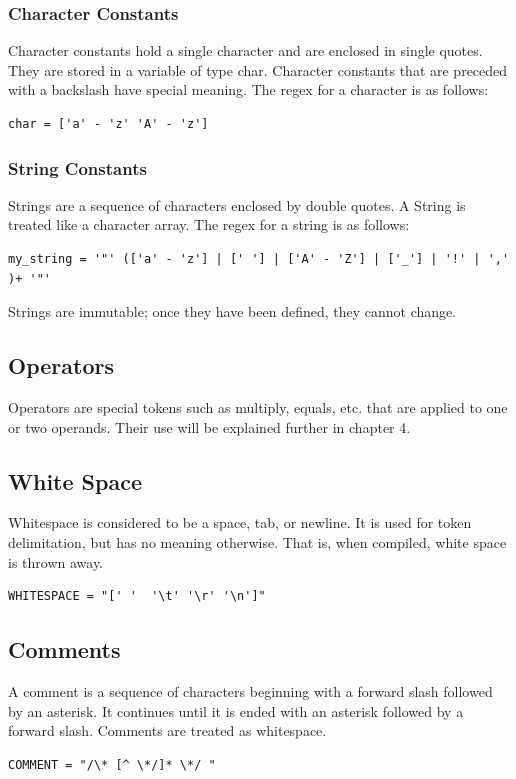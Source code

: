 \documentclass{article}
\begin{document}
\subsubsection{Character Constants}
Character constants hold a single character and are enclosed in single quotes. They are stored in a variable of type char. Character constants that are preceded with a backslash have special meaning. The regex for a character is as follows:

\begin{Verbatim}[frame=single]
char = ['a' - 'z' 'A' - 'z']
\end{Verbatim}

\subsubsection{String Constants}
Strings are a sequence of characters enclosed by double quotes. A String is treated like a character array. The regex for a string is as follows:

\begin{Verbatim}[frame=single]
my_string = '"' (['a' - 'z'] | [' '] | ['A' - 'Z'] | ['_'] | '!' | ',' )+ '"'
\end{Verbatim}
Strings are immutable; once they have been defined, they cannot change.

\subsection{Operators}
Operators are special tokens such as multiply, equals, etc. that are applied to one or two operands.  Their use will be explained further in chapter 4.

\subsection{White Space}
Whitespace is considered to be a space, tab, or newline. It is used for token delimitation, but has no meaning otherwise. That is, when compiled, white space is thrown away.

\begin{Verbatim}[frame=single]
WHITESPACE = "[' '  '\t' '\r' '\n']"
\end{Verbatim}

\subsection{Comments}
A comment is a sequence of characters beginning with a forward slash followed by an asterisk. It continues until it is ended with an asterisk followed by a forward slash. Comments are treated as whitespace. 
\begin{Verbatim}[frame=single]
COMMENT = "/\* [^ \*/]* \*/ "
\end{Verbatim}
\end{document}
